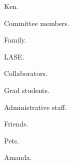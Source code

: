 Ken.\par
Committee members.\par
Family.\par
LASE.\par
Collaborators.\par
Grad students.\par
Administrative staff.\par
Friends.\par
Pets.\par
Amanda. 